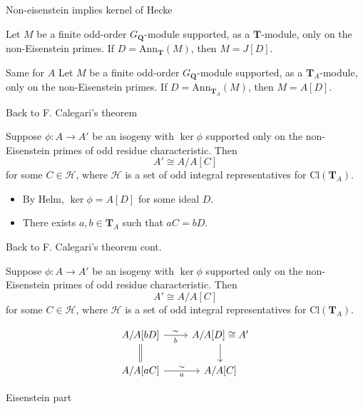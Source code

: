 \documentclass{beamer}
\newcommand{\QQ}{\mathbf{Q}}
\newcommand{\TT}{\mathbf{T}}
\renewcommand{\H}{\mathcal{H}}
\newcommand{\Ann}{\mathrm{Ann}}
\newcommand{\Cl}{\mathrm{Cl}}
\begin{document}
\begin{frame}{Non-eisenstein implies kernel of Hecke}
    \begin{theorem}[Helm]
        Let $M$ be a finite odd-order $G_\QQ$-module supported, as a $\TT$-module,
        only on the non-Eisenstein primes. If $D=\Ann_\TT(M)$, then $M=J[D]$.
    \end{theorem}
\begin{block}{Same for $A$}
    Let $M$ be a finite odd-order $G_\QQ$-module supported, as a $\TT_A$-module,
    only on the non-Eisenstein primes. If $D=\Ann_{\TT_A}(M)$, then $M=A[D]$.
\end{block}

\end{frame}

\begin{frame}{Back to F. Calegari's theorem}
    \begin{theorem}[F. Calegari]
        Suppose $\phi:A\to A'$ be an isogeny with $\ker\phi$ supported only on the
        non-Eisenstein primes of odd residue characteristic. Then
        \[
            A'\cong A/A[C]
        \]
        for some $C\in \H$, where $\H$ is a set of odd integral representatives
        for $\Cl(\TT_A)$.
    \end{theorem}
    \begin{itemize}
        \item
            By Helm, $\ker\phi=A[D]$ for some ideal $D$.
        \item
            There exists $a,b\in \TT_A$ such that $aC=bD$.
    \end{itemize}
\end{frame}

\begin{frame}[fragile]{Back to F. Calegari's theorem cont.}
    \begin{theorem}[F. Calegari]
        Suppose $\phi:A\to A'$ be an isogeny with $\ker\phi$ supported only on the
        non-Eisenstein primes of odd residue characteristic. Then
        \[
            A'\cong A/A[C]
        \]
        for some $C\in \H$, where $\H$ is a set of odd integral representatives
        for $\Cl(\TT_A)$.
    \end{theorem}
    \[
        \begin{tikzcd}
            A/A[bD]
            \arrow[r, "\sim", "b"']
            \ar[equal]{d}
            &
            A/A[D]\cong A'
            \ar[d]
            \\
            A/A[a C]
            \arrow[r, "\sim", "a"']
            &
            A/A[C]
        \end{tikzcd}
    \]
\end{frame}

\begin{frame}{Eisenstein part}
    
\end{frame}
\end{document}

